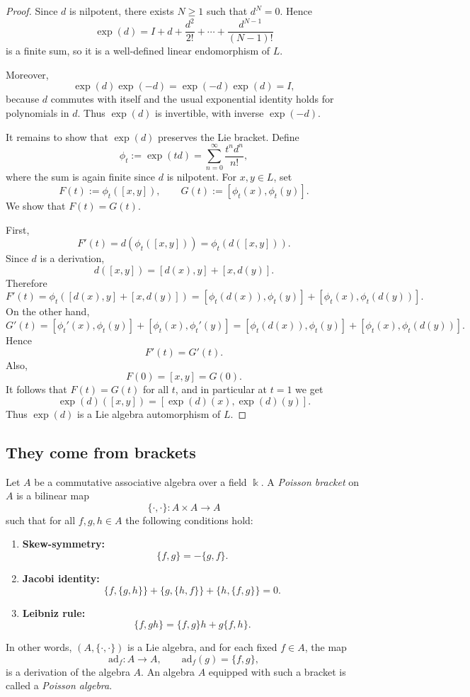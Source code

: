 \documentclass[11pt, a4paper]{report}
\begin{document}
    \begin{proof}
    Since $d$ is nilpotent, there exists $N\ge 1$ such that $d^N=0$. Hence
    \[
    \exp(d)=I+d+\frac{d^2}{2!}+\cdots+\frac{d^{N-1}}{(N-1)!}
    \]
    is a finite sum, so it is a well-defined linear endomorphism of $L$.
    
    Moreover,
    \[
    \exp(d)\exp(-d)=\exp(-d)\exp(d)=I,
    \]
    because $d$ commutes with itself and the usual exponential identity holds for polynomials in $d$.
    Thus $\exp(d)$ is invertible, with inverse $\exp(-d)$.
    
    It remains to show that $\exp(d)$ preserves the Lie bracket. Define
    \[
    \phi_t:=\exp(td)=\sum_{n=0}^{\infty}\frac{t^n d^n}{n!},
    \]
    where the sum is again finite since $d$ is nilpotent. For $x,y\in L$, set
    \[
    F(t):=\phi_t([x,y]), \qquad G(t):=[\phi_t(x),\phi_t(y)].
    \]
    We show that $F(t)=G(t)$.
    
    First,
    \[
    F'(t)=d(\phi_t([x,y]))=\phi_t(d([x,y])).
    \]
    Since $d$ is a derivation,
    \[
    d([x,y])=[d(x),y]+[x,d(y)].
    \]
    Therefore
    \[
    F'(t)=\phi_t([d(x),y]+[x,d(y)])
          =[\phi_t(d(x)),\phi_t(y)]+[\phi_t(x),\phi_t(d(y))].
    \]
    On the other hand,
    \[
    G'(t)=[\phi_t'(x),\phi_t(y)]+[\phi_t(x),\phi_t'(y)]
         =[\phi_t(d(x)),\phi_t(y)]+[\phi_t(x),\phi_t(d(y))].
    \]
    Hence
    \[
    F'(t)=G'(t).
    \]
    Also,
    \[
    F(0)=[x,y]=G(0).
    \]
    It follows that $F(t)=G(t)$ for all $t$, and in particular at $t=1$ we get
    \[
    \exp(d)([x,y])=[\exp(d)(x),\exp(d)(y)].
    \]
    Thus $\exp(d)$ is a Lie algebra automorphism of $L$.
\end{proof}

\subsection{They come from brackets}

\begin{definition}
    Let $A$ be a commutative associative algebra over a field $\Bbbk$.
    A \emph{Poisson bracket} on $A$ is a bilinear map
    \[
    \{\cdot,\cdot\}:A\times A\to A
    \]
    such that for all $f,g,h\in A$ the following conditions hold:
    \begin{enumerate}
        \item \textbf{Skew-symmetry:}
        \[
        \{f,g\}=-\{g,f\}.
        \]
        \item \textbf{Jacobi identity:}
        \[
        \{f,\{g,h\}\}+\{g,\{h,f\}\}+\{h,\{f,g\}\}=0.
        \]
        \item \textbf{Leibniz rule:}
        \[
        \{f,gh\}=\{f,g\}h+g\{f,h\}.
        \]
    \end{enumerate}
    In other words, $(A,\{\cdot,\cdot\})$ is a Lie algebra, and for each fixed
    $f\in A$, the map
    \[
    \mathrm{ad}_f:A\to A,\qquad \mathrm{ad}_f(g)=\{f,g\},
    \]
    is a derivation of the algebra $A$.
    An algebra $A$ equipped with such a bracket is called a \emph{Poisson algebra}.
    \end{definition}
    
\end{document}

